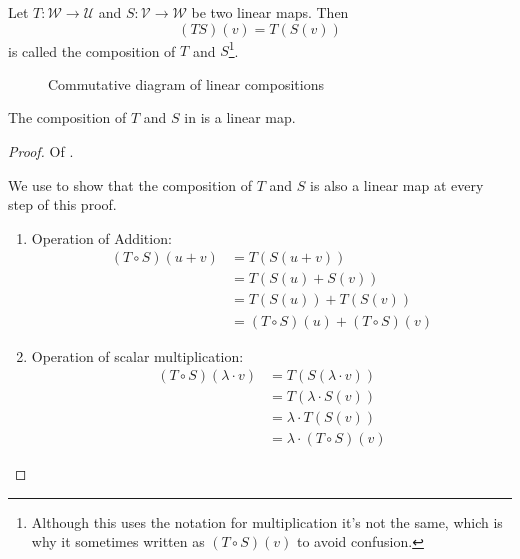 \begin{definition}\label{def-composition-of-linear-maps}
	Let $T:\mathcal{W}\to\mathcal{U}$ and $S:\mathcal{V}\to\mathcal{W}$
	be two linear maps. Then
	\begin{equation}
		(TS)(v)=T(S(v))
	\end{equation}
	is called the composition of $T$ and $S$\footnote{Although this uses the
		notation for multiplication it's not the same, which is why it sometimes
		written as $(T \circ S)(v)$ to avoid confusion.}.
	\begin{figure}[ht!]
		\centering
		\caption{Commutative diagram of linear compositions}
		\label{commutative-diagram:linear-composition}
	\end{figure}
\end{definition}

\begin{thm}\label{thm-composition-is-linear}
	The composition of $T$ and $S$ in 
	is a linear map.
\end{thm}

\begin{proof}
	Of .
	\begin{flushleft}
		We use  to show that the
		composition of $T$ and $S$ is also a linear map at every step of this proof.
		\begin{enumerate}
			\item Operation of Addition:
			      \begin{align*}
				      (T \circ S)(u+v) & = T(S(u+v))                       \\
				                       & = T(S(u)+S(v))                    \\
				                       & = T(S(u)) + T(S(v))               \\
				                       & = (T \circ S)(u) + (T \circ S)(v)
			      \end{align*}
			\item Operation of scalar multiplication:
			      \begin{align*}
				      (T \circ S)(\lambda \cdot v) & = T(S(\lambda \cdot v))        \\
				                                   & = T(\lambda \cdot S(v))        \\
				                                   & = \lambda \cdot T(S(v))        \\
				                                   & = \lambda \cdot (T \circ S)(v)
			      \end{align*}
		\end{enumerate}
	\end{flushleft}
\end{proof}

